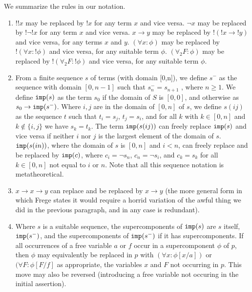 \documentclass{article}
\begin{document}
We summarize the rules in our notation.

\begin{enumerate}

\item  $!!x$ may be replaced by $!x$ for any term $x$ and vice versa.  $\neg x$ may be replaced by $!\neg !x$ for any term $x$ and vice versa.  $x \rightarrow y$ may be replaced by
$!(!x \rightarrow !y)$ and vice versa, for any terms $x$ and $y$.  $(\forall x:\phi)$ may be replaced by $!(\forall x:!\phi)$ and vice versa, for any suitable term $\phi$.  $(\forall_2 F:\phi)$ may be replaced by $!(\forall_2 F:!\phi)$ and vice versa, for any suitable term $\phi$.


\item From a finite sequence $s$ of terms (with domain [0,n]), we define $s^-$ as the sequence with domain $[0,n-1]$ such that $s^-_n =s_{n+1}$ , where $n\geq 1$.  We define ${\tt imp}(s)$ as the term $s_0$ if the domain of $S$ is $[0,0]$, and otherwise as $s_0 \rightarrow {\tt imp}(s^-)$.  Where $i,j$ are in the domain of $[0,n]$ of $s$, we define $s(ij)$ as the sequence $t$ such that $t_i=s_j$, $t_j=s_i$, and for all $k$ with $k \in [0,n]$ and $k \not\in \{i,j\}$ we have $s_k=t_k$.   The term ${\tt imp}(s(ij))$ can freely replace ${\tt imp}(s)$ and vice versa if neither $i$ nor $j$ is the largest element of the domain of $s$.  ${\tt imp}(s(in))$, where the domain of $s$ is $[0,n]$ and $i<n$, can freely replace and be replaced by 
${\tt imp}(c)$, where $c_i = \neg s_n$, $c_n = \neg s_i$, and $c_k = s_k$ for all $k \in [0,n]$ not equal to $i$ or $n$.  Note that all this sequence notation is metatheoretical.

\item $x \rightarrow x \rightarrow y$ can replace and be replaced by $x \rightarrow y$ (the more general form in which Frege states it would require a horrid variation of the awful thing we did in the previous paragraph, and in any case is redundant).

\item  Where $s$ is a suitable sequence, the supercomponents of ${\tt imp}(s)$ are $s$ itself, ${\tt imp}(s^-)$, and the supercomponents of ${\tt imp}(s^-)$ if it has supercomponents.
If all occurrences of a free variable $a$  or $f$ occur in a supercomponent $\phi$ of $p$, then $\phi$ may equivalently be replaced in $p$ with $(\forall x:\phi[x/a])$ or
$(\forall F:\phi[F/f]$ as appropriate, the variables $x$ and $F$ not occurring in $p$.  This move may also be reversed (introducing a free variable not occuring in the initial assertion).


\end{enumerate}
\end{document}
